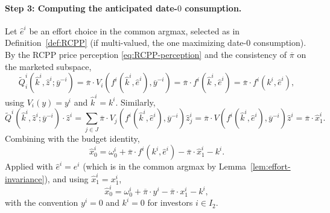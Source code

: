 \documentclass[11pt,a4paper,oneside]{book}
\theoremstyle{plain}
\theoremstyle{definition}
\theoremstyle{remark}
\numberwithin{equation}{chapter}
\begin{document}
\paragraph{Step 3: Computing the anticipated date-$0$ consumption.}
Let $\widehat{e}^i$ be an effort choice in the common argmax, selected as in Definition~\ref{def:RCPP} (if multi-valued, the one maximizing date-$0$ consumption).
By the RCPP price perception \eqref{eq:RCPP-perception} and the consistency of $\overline{\pi}$ on the marketed subspace,
\begin{equation*}
  \widetilde{Q}^i_i(\widehat{k}^i, \widehat{z}^i; \overline{y}^{-i})
  = \overline{\pi} \cdot V_i(f^i(\widehat{k}^i, \widehat{e}^i), \overline{y}^{-i})
  = \overline{\pi} \cdot f^i(\widehat{k}^i, \widehat{e}^i)
  = \overline{\pi} \cdot f^i(k^i, \widehat{e}^i),
\end{equation*}
using $V_i(y) = y^i$ and $\widehat{k}^i = k^i$.
Similarly,
\begin{equation*}
  \widetilde{Q}^i(\widehat{k}^i, \widehat{z}^i; \overline{y}^{-i}) \cdot \widehat{z}^i
  = \sum_{j \in J} \overline{\pi} \cdot V_j(f^i(\widehat{k}^i, \widehat{e}^i), \overline{y}^{-i}) \widehat{z}^i_j
  = \overline{\pi} \cdot V(f^i(\widehat{k}^i, \widehat{e}^i), \overline{y}^{-i}) \widehat{z}^i
  = \overline{\pi} \cdot \widehat{x}^i_1.
\end{equation*}
Combining with the budget identity,
\begin{equation}\label{eq:x-hat-0}
  \widehat{x}^i_0
  = \omega^i_0 + \overline{\pi} \cdot f^i(k^i, \widehat{e}^i) - \overline{\pi} \cdot \widehat{x}^i_1 - k^i.
\end{equation}
Applied with $\widehat{e}^i = e^i$ (which is in the common argmax by Lemma~\ref{lem:effort-invariance}), and using $\widehat{x}^i_1 = x^i_1$,
\begin{equation}\label{eq:x-hat-0-final}
  \widehat{x}^i_0
  = \omega^i_0 + \overline{\pi} \cdot y^i - \overline{\pi} \cdot x^i_1 - k^i,
\end{equation}
with the convention $y^i = 0$ and $k^i = 0$ for investors $i \in I_2$.
\end{document}
